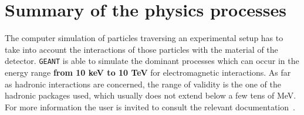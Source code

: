 \section{Summary of the physics processes}
 
The computer simulation of particles traversing an
experimental setup has to take into account the interactions of those
particles with the material of the detector.
{\tt GEANT} is able to simulate the dominant processes which can occur in the
energy range {\bf from 10 keV to 10 TeV} for electromagnetic interactions.
As far as hadronic interactions are concerned, the range of validity
is the one of the hadronic packages used, which usually does not extend
below a few tens of MeV. For more information the user is invited to 
consult the relevant 
documentation~\cite{bib-GHEI,bib-FLUK,bib-FLU1,bib-FLU2,bib-FLU3,bib-FLU4}.
 
